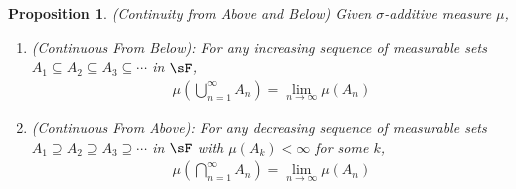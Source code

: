 \documentclass[12pt]{article}
\theoremstyle{plain}
\newtheorem{prop}[thm]{Proposition}
\theoremstyle{definition}
\theoremstyle{remark}
\begin{document}
\begin{prop}\emph{(Continuity from Above and Below)}
\label{prop:prop-meas}
Given $\sigma$-additive measure $\mu$,
\begin{enumerate}
  \item \emph{(Continuous From Below)}: For any increasing sequence of
    measurable sets $A_1\subseteq A_2\subseteq A_3 \subseteq \cdots$ in
    $\sF$,
    \begin{align*}
      \mu\left(\bigcup^\infty_{n=1} A_n\right) =
      \lim_{n\rightarrow\infty} \mu(A_n)
    \end{align*}

  \item \emph{(Continuous From Above)}:
    For any decreasing sequence of measurable sets
    $A_1 \supseteq A_2 \supseteq A_3 \supseteq \cdots$ in $\sF$
    with $\mu(A_k)<\infty$ for some $k$,
    \begin{align*}
      \mu\left(\bigcap^\infty_{n=1} A_n\right)
      = \lim_{n\rightarrow\infty} \mu(A_n)
    \end{align*}
\end{enumerate}
\end{prop}
\end{document}
